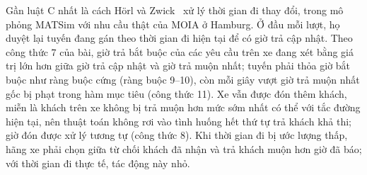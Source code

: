 Gần luật C nhất là cách Hörl và Zwick~\cite{horl2022} xử lý thời gian đi thay đổi, trong mô phỏng MATSim với nhu cầu
thật của MOIA ở Hamburg. Ở đầu mỗi lượt, họ duyệt lại tuyến đang gán theo thời gian đi hiện tại để
có giờ trả cập nhật. Theo công thức 7 của bài, giờ trả bắt buộc của các yêu cầu trên xe đang xét bằng giá trị lớn hơn
giữa giờ trả cập nhật và giờ trả muộn nhất; tuyến phải thỏa giờ bắt buộc như ràng buộc cứng (ràng buộc 9--10), còn
mỗi giây vượt giờ trả muộn nhất gốc bị phạt trong hàm mục tiêu (công thức 11). Xe vẫn được đón thêm khách, miễn là
khách trên xe không bị trả muộn hơn mức sớm nhất có thể với tắc đường hiện tại, nên thuật toán không rơi vào tình huống
hết thứ tự trả khách khả thi; giờ đón được xử lý tương tự (công thức 8). Khi thời gian đi bị ước lượng thấp, hãng xe
phải chọn giữa từ chối khách đã nhận và trả khách muộn hơn giờ đã báo; với thời gian đi thực tế, tác động này nhỏ.

